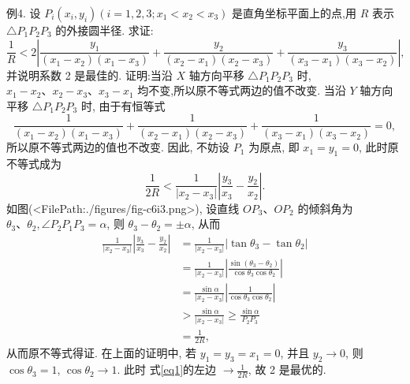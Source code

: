 例4. 设 $P_i\left(x_i, y_i\right)\left(i=1,2,3 ; x_1<x_2<x_3\right)$ 是直角坐标平面上的点,用 $R$ 表示 $\triangle P_1 P_2 P_3$ 的外接圆半径.
求证:
$$
\frac{1}{R}<2\left|\frac{y_1}{\left(x_1-x_2\right)\left(x_1-x_3\right)}+\frac{y_2}{\left(x_2-x_1\right)\left(x_2-x_3\right)}+\frac{y_3}{\left(x_3-x_1\right)\left(x_3-x_2\right)}\right|,
$$
并说明系数 2 是最佳的.
证明:当沿 $X$ 轴方向平移 $\triangle P_1 P_2 P_3$ 时, $x_1-x_2 、 x_2-x_3 、 x_3-x_1$ 均不变,所以原不等式两边的值不改变.
当沿 $Y$ 轴方向平移 $\triangle P_1 P_2 P_3$ 时, 由于有恒等式
$$
\frac{1}{\left(x_1-x_2\right)\left(x_1-x_3\right)}+\frac{1}{\left(x_2-x_1\right)\left(x_2-x_3\right)}+\frac{1}{\left(x_3-x_1\right)\left(x_3-x_2\right)}=0,
$$
所以原不等式两边的值也不改变.
因此, 不妨设 $P_1$ 为原点, 即 $x_1=y_1=0$, 此时原不等式成为
$$
\frac{1}{2 R}<\frac{1}{\left|x_2-x_3\right|}\left|\frac{y_3}{x_3}-\frac{y_2}{x_2}\right| .
$$
如图(<FilePath:./figures/fig-c6i3.png>), 设直线 $O P_3 、 O P_2$ 的倾斜角为 $\theta_3 、 \theta_2, \angle P_2 P_1 P_3=\alpha$, 则 $\theta_3- \theta_2= \pm \alpha$, 从而
$$
\begin{aligned}
\frac{1}{\left|x_2-x_3\right|}\left|\frac{y_3}{x_3}-\frac{y_2}{x_2}\right| & =\frac{1}{\left|x_2-x_3\right|}\left|\tan \theta_3-\tan \theta_2\right| \\
& =\frac{1}{\left|x_2-x_3\right|}\left|\frac{\sin \left(\theta_3-\theta_2\right)}{\cos \theta_3 \cos \theta_2}\right| \\
& =\frac{\sin \alpha}{\left|x_2-x_3\right|}\left|\frac{1}{\cos \theta_3 \cos \theta_2}\right| \\
& >\frac{\sin \alpha}{\left|x_2-x_3\right|} \geqslant \frac{\sin \alpha}{P_2 P_3} \\
& =\frac{1}{2 R}, \label{eq1}
\end{aligned}
$$
从而原不等式得证.
在上面的证明中, 若 $y_1=y_3=x_1=0$, 并且 $y_2 \rightarrow 0$, 则 $\cos \theta_3=1$, $\cos \theta_2 \rightarrow 1$. 此时 式\ref{eq1}的左边 $\rightarrow \frac{1}{2 R}$, 故 2 是最优的.



